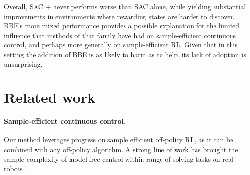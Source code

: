 Overall, SAC + \algshort{} never performs worse than SAC alone, while yielding substantial improvements in environments where rewarding states are harder to discover.
BBE's more mixed performance provides a possible explanation for the limited influence that methods of that family have had on sample-efficient continuous control, and perhaps more generally on sample-efficient RL.
Given that in this setting the addition of BBE is as likely to harm as to help, its lack of adoption is unsurprising.








\section{Related work}

\paragraph{Sample-efficient continuous control.}
Our method leverages progress on sample efficient off-policy RL, as it can be combined with any off-policy algorithm.
A strong line of work has brought the sample complexity of model-free control within range of solving tasks on real robots \citep{Popov2017DataefficientDR,kalashnikov2018qt,haarnoja2018soft,fujimoto2018addressing,haarnoja2018softapp,Abdolmaleki2018MaximumAP}.



